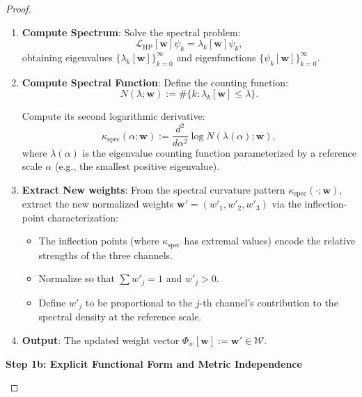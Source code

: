 \begin{lemma}
\begin{proof}
\begin{enumerate}
\item[\textbf{(3)}] \textbf{Compute Spectrum}: Solve the spectral problem:
\begin{equation}
\mathcal{L}_{\mathrm{HP}}[\mathbf{w}] \psi_k = \lambda_k[\mathbf{w}] \psi_k,
\end{equation}
obtaining eigenvalues $\{\lambda_k[\mathbf{w}]\}_{k=0}^\infty$ and eigenfunctions $\{\psi_k[\mathbf{w}]\}_{k=0}^\infty$.

\item[\textbf{(4)}] \textbf{Compute Spectral Function}: Define the counting function:
\begin{equation}
N(\lambda; \mathbf{w}) := \#\{ k : \lambda_k[\mathbf{w}] \leq \lambda \}.
\end{equation}

Compute its second logarithmic derivative:
\begin{equation}
\kappa_{\mathrm{spec}}(\alpha; \mathbf{w}) := \frac{d^2}{d\alpha^2} \log N(\lambda(\alpha); \mathbf{w}),
\end{equation}
where $\lambda(\alpha)$ is the eigenvalue counting function parameterized by a reference scale $\alpha$ (e.g., the smallest positive eigenvalue).

\item[\textbf{(5)}] \textbf{Extract New weights}: From the spectral curvature pattern $\kappa_{\mathrm{spec}}(\cdot; \mathbf{w})$, extract the new normalized weights $\mathbf{w}' = (w'_1, w'_2, w'_3)$ via the inflection-point characterization:

\begin{itemize}
\item The inflection points (where $\kappa_{\mathrm{spec}}$ has extremal values) encode the relative strengths of the three channels.
\item Normalize so that $\sum w'_j = 1$ and $w'_j > 0$.
\item Define $w'_j$ to be proportional to the $j$-th channel's contribution to the spectral density at the reference scale.
\end{itemize}

\item[\textbf{(6)}] \textbf{Output}: The updated weight vector $\Phi_w[\mathbf{w}] := \mathbf{w}' \in \mathcal{W}$.

\end{enumerate}

\textbf{Step 1b: Explicit Functional Form and Metric Independence}

\begin{lemma}
\label{lem:weightDeterminationContraction}


\end{lemma}
\end{proof}
\end{lemma}
